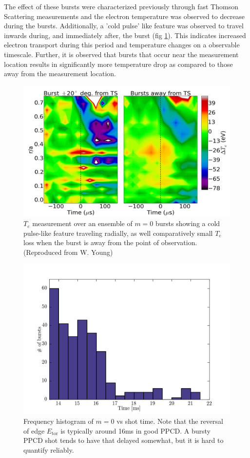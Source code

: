 \begin{refsection}
The effect of these bursts were characterized previously through fast Thomson Scattering measurements and the electron temperature was observed to decrease during the bursts. Additionally, a 'cold pulse' like feature was observed to travel inwards during, and immediately after, the burst (fig \ref{fig:m0_te_pulse}). This indicates increased electron transport during this period and temperature changes on a observable timescale. Further, it is observed that bursts that occur near the measurement location results in significantly more temperature drop as compared to those away from the measurement location. 
\begin{figure}
	\centering
	\includegraphics[width = 0.8\linewidth]{./m0_and_impurity_heating/m0_te_pulse.png}
	\caption[$T_e$ during $m = 0$ bursts]{$T_e$ measurement over an ensemble of $m = 0$ bursts showing a cold pulse-like feature traveling radially, as well comparatively small $T_e$ loss when the burst is away from the point of observation. (Reproduced from W. Young\cite{Young2015})}\label{fig:m0_te_pulse}
\end{figure}
\begin{figure}
	\centering
	\includegraphics[width = 0.8\linewidth]{./m0_and_impurity_heating/m0_time_hist.png}
	\caption[Frequency histogram of $m = 0$ vs shot time]{Frequency histogram of $m = 0$ vs shot time. Note that the reversal of edge $E_\text{tor}$ is typically around 16ms in good PPCD. A bursty PPCD shot tends to have that delayed somewhat, but it is hard to quantify reliably.}\label{fig:m0_shot_time}
\end{figure}


\end{refsection}
